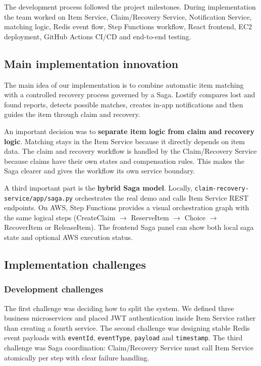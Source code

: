 \documentclass[11pt,a4paper]{article}
\begin{document}
The development process followed the project milestones. During implementation the team worked on
Item Service, Claim/Recovery Service, Notification Service, matching logic, Redis event flow,
Step Functions workflow, React frontend, EC2 deployment, GitHub Actions CI/CD and end-to-end testing.

\subsection{Main implementation innovation}

The main idea of our implementation is to combine automatic item matching with a controlled
recovery process governed by a Saga. Lostify compares lost and found reports, detects possible
matches, creates in-app notifications and then guides the item through claim and recovery.

An important decision was to \textbf{separate item logic from claim and recovery logic}. Matching
stays in the Item Service because it directly depends on item data. The claim and recovery
workflow is handled by the Claim/Recovery Service because claims have their own states and
compensation rules. This makes the Saga clearer and gives the workflow its own service boundary.

A third important part is the \textbf{hybrid Saga model}. Locally, \texttt{claim-recovery-service/app/saga.py}
orchestrates the real demo and calls Item Service REST endpoints. On AWS, Step Functions provides
a visual orchestration graph with the same logical steps (CreateClaim $\rightarrow$ ReserveItem $\rightarrow$
Choice $\rightarrow$ RecoverItem or ReleaseItem). The frontend Saga panel can show both local saga state
and optional AWS execution status.

\subsection{Implementation challenges}

\subsubsection{Development challenges}

The first challenge was deciding how to split the system. We defined three business microservices
and placed JWT authentication inside Item Service rather than creating a fourth service. The second
challenge was designing stable Redis event payloads with \texttt{eventId}, \texttt{eventType},
\texttt{payload} and \texttt{timestamp}. The third challenge was Saga coordination: Claim/Recovery
Service must call Item Service atomically per step with clear failure handling.
\end{document}
